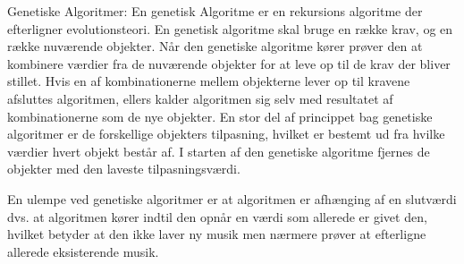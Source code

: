Genetiske Algoritmer:
En genetisk Algoritme er en rekursions algoritme der efterligner evolutionsteori. En genetisk algoritme skal bruge en række krav, og en række nuværende objekter.
Når den genetiske algoritme kører prøver den at kombinere værdier fra de nuværende objekter for at leve op til de krav der bliver stillet. Hvis en af kombinationerne mellem objekterne lever op til kravene afsluttes algoritmen, ellers kalder algoritmen sig selv med resultatet af kombinationerne som de nye objekter.
En stor del af princippet bag genetiske algoritmer er de forskellige objekters tilpasning, hvilket er bestemt ud fra hvilke værdier hvert objekt består af. I starten af den genetiske algoritme fjernes de objekter med den laveste tilpasningsværdi.

En ulempe ved genetiske algoritmer er at algoritmen er afhænging af en slutværdi dvs. at algoritmen kører indtil den opnår en værdi som allerede er givet den, hvilket betyder at den ikke laver ny musik men nærmere prøver at efterligne allerede eksisterende musik. 

